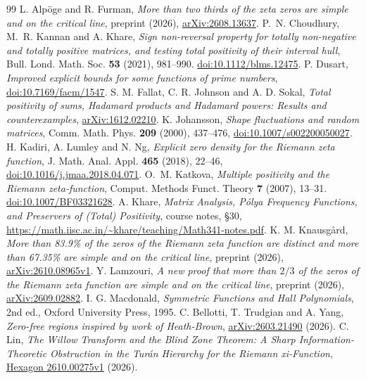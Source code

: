 \documentclass[11pt,a4paper,reqno]{amsart}
\numberwithin{equation}{section}
\begin{document}
\begin{thebibliography}{99}
 L. Alp\"oge and R. Furman, \emph{More than two thirds of the zeta zeros are simple and on the critical line}, preprint (2026), \href{https://arxiv.org/abs/2608.13637}{arXiv:2608.13637}.
 P.~N. Choudhury, M.~R. Kannan and A. Khare,
\emph{Sign non-reversal property for totally non-negative and totally positive matrices, and testing total positivity of their interval hull},
Bull. Lond. Math. Soc. \textbf{53} (2021), 981--990.
\href{https://doi.org/10.1112/blms.12475}{doi:10.1112/blms.12475}.
 P. Dusart, \emph{Improved explicit bounds for some functions of prime numbers}, \href{https://doi.org/10.7169/facm/1547}{doi:10.7169/facm/1547}.
 S. M. Fallat, C. R. Johnson and A. D. Sokal, \emph{Total positivity of sums, Hadamard products and Hadamard powers: Results and counterexamples}, \href{https://arxiv.org/abs/1612.02210}{arXiv:1612.02210}.
 K. Johansson, \emph{Shape fluctuations and random matrices}, Comm. Math. Phys. \textbf{209} (2000), 437--476, \href{https://doi.org/10.1007/s002200050027}{doi:10.1007/s002200050027}.
 H. Kadiri, A. Lumley and N. Ng, \emph{Explicit zero density for the Riemann zeta function}, J. Math. Anal. Appl. \textbf{465} (2018), 22--46, \href{https://doi.org/10.1016/j.jmaa.2018.04.071}{doi:10.1016/j.jmaa.2018.04.071}.
 O.~M. Katkova, \emph{Multiple positivity and the Riemann zeta-function}, Comput. Methods Funct. Theory \textbf{7} (2007), 13--31. \href{https://doi.org/10.1007/BF03321628}{doi:10.1007/BF03321628}.
 A. Khare, \emph{Matrix Analysis, Pólya Frequency Functions, and Preservers of (Total) Positivity}, course notes, \S30, \url{https://math.iisc.ac.in/~khare/teaching/Math341-notes.pdf}.
 K. M. Knausg{\aa}rd, \emph{More than 83.9\% of the zeros of the Riemann zeta function are distinct and more than 67.35\% are simple and on the critical line}, preprint (2026), \href{https://arxiv.org/abs/2610.08965v1}{arXiv:2610.08965v1}.
 Y. Lamzouri, \emph{A new proof that more than \(2/3\) of the zeros of the Riemann zeta function are simple and on the critical line}, preprint (2026), \href{https://arxiv.org/abs/2609.02882}{arXiv:2609.02882}.
 I. G. Macdonald, \emph{Symmetric Functions and Hall Polynomials}, 2nd ed., Oxford University Press, 1995.
 C. Bellotti, T. Trudgian and A. Yang, \emph{Zero-free regions inspired by work of Heath-Brown}, \href{https://arxiv.org/abs/2603.21490}{arXiv:2603.21490} (2026).
 C. Lin, \emph{The Willow Transform and the Blind Zone Theorem: A Sharp Information-Theoretic Obstruction in the Turán Hierarchy for the Riemann xi-Function}, \href{https://hexagonmath.org/2610.00275v1}{Hexagon 2610.00275v1} (2026).

\end{thebibliography}
\end{document}
